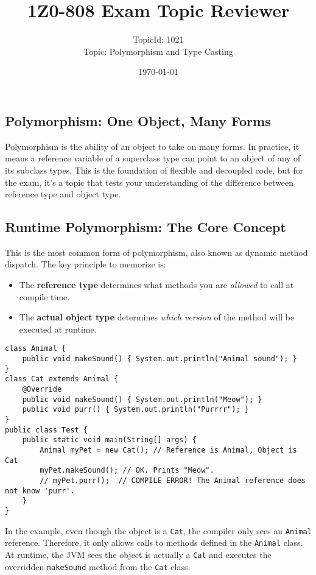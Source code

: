 \documentclass[12pt]{article}
\title{\textbf{1Z0-808 Exam Topic Reviewer}}
\author{TopicId: 1021 \\ Topic: Polymorphism and Type Casting}
\date{\today}
\begin{document}
\maketitle
\newpage\begin{enumerate}[label=(\arabic*)]
\section*{Polymorphism: One Object, Many Forms}
Polymorphism is the ability of an object to take on many forms. In practice, it means a reference variable of a superclass type can point to an object of any of its subclass types. This is the foundation of flexible and decoupled code, but for the exam, it's a topic that tests your understanding of the difference between reference type and object type.

\subsection{Runtime Polymorphism: The Core Concept}
This is the most common form of polymorphism, also known as dynamic method dispatch. The key principle to memorize is:
\begin{itemize}
    \item The \textbf{reference type} determines what methods you are \textit{allowed} to call at compile time.
    \item The \textbf{actual object type} determines \textit{which version} of the method will be executed at runtime.
\end{itemize}
\begin{verbatim}
class Animal {
    public void makeSound() { System.out.println("Animal sound"); }
}
class Cat extends Animal {
    @Override
    public void makeSound() { System.out.println("Meow"); }
    public void purr() { System.out.println("Purrrr"); }
}
public class Test {
    public static void main(String[] args) {
        Animal myPet = new Cat(); // Reference is Animal, Object is Cat
        myPet.makeSound(); // OK. Prints "Meow".
        // myPet.purr();  // COMPILE ERROR! The Animal reference does not know 'purr'.
    }
}
\end{verbatim}
In the example, even though the object is a \texttt{Cat}, the compiler only sees an \texttt{Animal} reference. Therefore, it only allows calls to methods defined in the \texttt{Animal} class. At runtime, the JVM sees the object is actually a \texttt{Cat} and executes the overridden \texttt{makeSound} method from the \texttt{Cat} class.


\end{enumerate}
\end{document}
